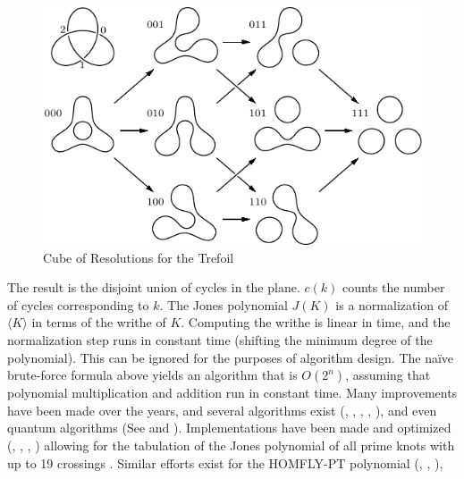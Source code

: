 \documentclass{article}
\theoremstyle{plain}
\begin{document}
        \begin{figure}
            \centering
            \includegraphics{trefoil_knot_cube_of_resolutions.pdf}
            \caption{Cube of Resolutions for the Trefoil}
            \label{fig:cube_of_resolutions}
        \end{figure}
        The result is the disjoint union of
        cycles in the plane. $c(k)$ counts the number of cycles corresponding
        to $k$. The Jones polynomial $J(K)$ is a normalization of
        $\langle{K}\rangle$ in terms of the writhe of $K$. Computing the writhe
        is linear in time, and the normalization step runs in constant time
        (shifting the minimum degree of the polynomial). This can be ignored for
        the purposes of algorithm design. The na\"{i}ve brute-force formula
        above yields an algorithm that is $O(2^{n})$, assuming that
        polynomial multiplication and addition run in constant time.
        Many improvements have been made over the years, and several
        algorithms exist (\cite{Thistlethwaite1987SpanningTreeJones},
        \cite{Zulli1995MatrixForJonesPolynomial},
        \cite{ElMisieryElHorbatyJonesAlgorithm},
        \cite{Gousbet2001JonesAlgorithm},
        \cite{MustafaLevitt2018JonesAlgorithm}), and even quantum algorithms
        (See \cite{JonesQuantumAlgorithm} and \cite{Lomonaco2008AQM}).
        Implementations have been made
        and optimized (\cite{sage}, \cite{regina},
        \cite{SnapPy}, \cite{libtmpl})
        allowing for the tabulation of the Jones polynomial of
        all prime knots with up to 19 crossings
        \cite{JonesData}. Similar efforts exist for the HOMFLY-PT polynomial
        (\cite{Gousbet1999HOMFLYAlgorithm},
        \cite{Burton2018HOMFLFixedParameter},
        \cite{Burton2012ComputationalTW}),
\end{document}
